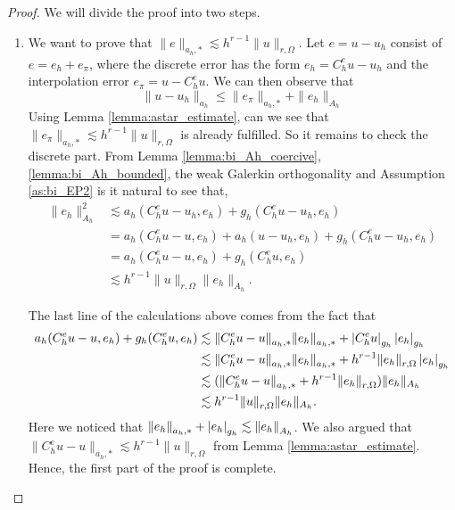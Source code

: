 \begin{proof}
    We will divide the proof into two steps.
    \begin{enumerate}[label=\arabic*)]
        \item We want to prove that $\| e \|_{ a_{h},* }^{  } \lesssim   h^{r-1} \| u \|_{ r,\Omega  }^{  }$.
    Let $e = u - u_{h}$ consist of $e = e_{h} + e_{\pi }$, where the discrete error has the form $e_{h} = C _{h}^{e} u - u_{h}$ and the interpolation error $e_{\pi } = u - C _{h} ^{e}u$. We can then observe that
    \[
    \| u - u_{h} \|_{ a_{h} }^{  }  \le \| e_{\pi } \|_{a_{h},*}^{  } + \| e_{h} \|_{A_{h}  }^{  }
    \]
Using Lemma \ref{lemma:astar_estimate}, can we see that $\| e_{\pi } \|_{a_{h},*}^{  } \lesssim h^{r-1} \| u \|_{ r,\Omega  }^{  }  $ is already fulfilled. So it remains to check the discrete part. From Lemma \ref{lemma:bi_Ah_coercive}, \ref{lemma:bi_Ah_bounded}, the weak Galerkin orthogonality and Assumption \ref{as:bi_EP2} is it natural to see that, \[
    \begin{split}
\| e_{h} \|_{ A_{h} }^{ 2 } & \lesssim a_{h}( C _{h}^{e} u - u_{h}, e_{h}) + g_{h}( C _{h}^{e}u - u_{h}, e_{h}) \\
 & = a_{h}( C _{h}^{e} u - u, e_{h}) + a_{h}( u - u_{h}, e_{h}) + g_{h}( C _{h}^{e}u - u_{h}, e_{h}) \\
 & = a_{h}( C _{h}^{e} u - u, e_{h}) + g_{h}( C _{h}^{e}u, e_{h}) \\
 & \lesssim h^{r-1} \| u \|_{ r, \Omega  }^{  } \| e_{h} \|_{ A_{h} }^{  }.
    \end{split}
\]



The last line of the calculations above comes from the fact that
\[
    \begin{split}
        a_{h}( C _{h}^{e} u - u, e_{h}) + g_{h}( C _{h}^{e}u, e_{h}) &\lesssim \| C _{h}^{e} u - u \|_{a_{h},*  }^{  } \| e_{h} \|_{a_{h},*  }^{  }
        + \left\lvert  C _{h}^{e}u  \right\rvert_{g_{h}} \left\lvert e_{h}   \right\rvert_{g_{h}} \\
         &\lesssim \| C _{h}^{e} u - u \|_{a_{h},*  }^{  } \| e_{h} \|_{a_{h},*  }^{  } + h^{r-1} \| e_{h} \|_{r, \Omega   }^{  }\left\lvert e_{h}   \right\rvert_{g_{h}} \\
         &\lesssim (\| C _{h}^{e} u - u \|_{a_{h},*  }^{  } + h^{r-1} \| e_{h} \|_{r, \Omega   }^{  }) \|e_{h}\|_{A_{h}} \\
         &\lesssim  h^{r-1} \| u \|_{r, \Omega   }^{  } \|e_{h}\|_{A_{h}}.
    \end{split}
\]
Here we noticed that $\| e_{h} \|_{a_{h},*  }^{  } + \left\lvert e_{h}   \right\rvert_{g_{h}} \lesssim \| e_{h} \|_{ A_{h} }^{  }  $. We also argued that $\| C _{h}^{e} u - u \|_{a_{h},*  }^{  } \lesssim h^{r-1}\| u \|_{ r,\Omega  }^{  }  $ from Lemma
\ref{lemma:astar_estimate}.
Hence, the first part of the proof is complete.


\end{enumerate}
\end{proof}
